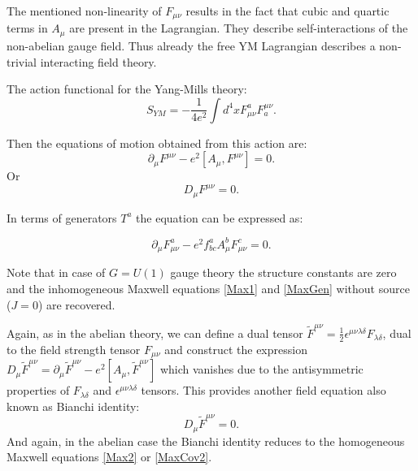 \documentclass[11pt]{report}
\theoremstyle{plain}
\theoremstyle{definition}
\theoremstyle{remark}
\theoremstyle{remark}
\numberwithin{equation}{section}
\begin{document}
 The mentioned non-linearity of $F_{\mu \nu}$ results in the fact that cubic and quartic terms in $A_{\mu}$ are present in the Lagrangian. They describe self-interactions of the non-abelian gauge field. Thus already the free YM Lagrangian describes a non-trivial interacting field theory.
 
 The action functional for the Yang-Mills theory:
 \begin{equation}
 S_{YM} = -\frac{1}{4e^2}\int d^4x F_{\mu \nu}^aF^{\mu \nu}_a.
 \end{equation}
 
 Then the equations of motion obtained from this action are:
 \begin{equation}
 \partial_\mu F^{\mu \nu} - e^2[A_\mu, F^{\mu\nu}]=0.
 \end{equation}
 Or
 \begin{equation}
 D_\mu F^{\mu\nu} = 0.
 \end{equation}
 
 In terms of generators $T^a$ the equation can be expressed as:
 
  \begin{equation}
 \partial_\mu F_{\mu \nu}^a - e^2f^a_{bc} A^b_\mu F^c_{\mu\nu}=0.
 \end{equation}
 
Note that in case of $G=U(1)$ gauge theory the structure constants are zero and the inhomogeneous Maxwell equations \eqref{Max1} and \eqref{MaxGen} without source ($J=0$) are recovered. 
 
 Again, as in the abelian theory, we can define a dual tensor $\tilde{F}^{\mu\nu} = \frac{1}{2}\epsilon^{\mu\nu\lambda\delta}F_{\lambda\delta}$, dual to the field strength tensor $F_{\mu\nu}$ and construct the expression $D_{\mu}\tilde{F}^{\mu\nu} = \partial_{\mu} \tilde{F}^{\mu\nu} - e^2 [A_{\mu}, \tilde{F}^{\mu\nu}]$ which vanishes due to the antisymmetric properties of ${F}_{\lambda\delta}$ and $\epsilon^{\mu\nu\lambda\delta}$ tensors.
 This provides another field equation also known as Bianchi identity:
 \begin{equation}
 D_{\mu}\tilde{F}^{\mu\nu} = 0.
 \end{equation}
 And again, in the abelian case the Bianchi identity reduces to the homogeneous Maxwell equations \eqref{Max2} or \eqref{MaxCov2}.

 
 
 
 
\end{document}
